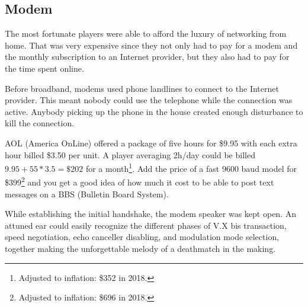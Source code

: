 \subsection{Modem}
The most fortunate players were able to afford the luxury of networking from home. That was very expensive since they not only had to pay for a modem and the monthly subscription to an Internet provider, but they also had to pay for the time spent online.\\
\par 
Before broadband, modems used phone landlines to connect to the Internet provider. This meant nobody could use the telephone while the connection was active. Anybody picking up the phone in the house created enough disturbance to kill the connection.\\
\par
AOL (America OnLine) offered a package of five hours for \$9.95 with each extra hour billed \$3.50 per unit. A player averaging 2h/day could be billed $9.95 + 55 * 3.5 = \$202 $ for a month\footnote{Adjusted to inflation: \$352 in 2018.}. Add the price of a fast 9600 baud model for \$399\footnote{Adjusted to inflation: \$696 in 2018.} and you get a good idea of how much it cost to be able to post text messages on a BBS (Bulletin Board System).\\
\par
{}

 While establishing the initial handshake, the modem speaker was kept open. An attuned ear could easily recognize the different phases of V.X bis transaction, speed negotiation, echo canceller disabling, and modulation mode selection, together making the unforgettable melody of a deathmatch in the making.\\
 \par 
{}
\par
 
